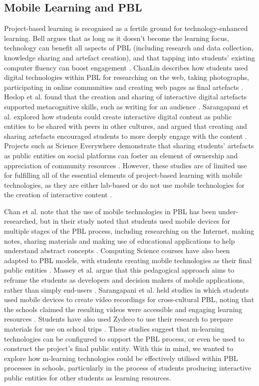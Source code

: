 \subsection{Mobile Learning and PBL}
Project-based learning is recognised as a fertile ground for technology-enhanced learning. Bell argues that as long as it doesn't become the learning focus, technology can benefit all aspects of PBL (including research and data collection, knowledge sharing and artefact creation), and that tapping into students' existing computer fluency can boost engagement \citep{Bell2010}. ChanLin describes how students used digital technologies within PBL for researching on the web, taking photographs, participating in online communities and creating web pages as final artefacts \citep{ChanLin2008}. Heslop et al. found that the creation and sharing of interactive digital artefacts supported metacognitive skills, such as writing for an audience \citep{Heslop2017}. Sarangapani et al. explored how students could create interactive digital content as public entities to be shared with peers in other cultures, and argued that creating and sharing artefacts encouraged students to more deeply engage with the content \citep{Sarangapani2018}. Projects such as Science Everywhere demonstrate that sharing students' artefacts as public entities on social platforms can foster an element of ownership and appreciation of community resources \citep{ahn2018}. However, these studies are of limited use for fulfilling all of the essential elements of project-based learning with mobile technologies, as they are either lab-based \citep{Heslop2017} or do not use mobile technologies for the creation of interactive content \citep{Sarangapani2018, ChanLin2008}.

Chan et al. note that the use of mobile technologies in PBL has been under-researched, but in their study noted that students used mobile devices for multiple stages of the PBL process, including researching on the Internet, making notes, sharing materials and making use of educational applications to help understand abstract concepts \citep{Chan2015}. Computing Science courses have also been adapted to PBL models, with students creating mobile technologies as their final public entities \citep{Massey2006, Rahman2018}. Massey et al. argue that this pedagogical approach aims to reframe the students as developers and decision makers of mobile applications, rather than simply end-users \citep{Massey2006}. Sarangapani et al. held studies in which students used mobile devices to create video recordings for cross-cultural PBL, noting that the schools claimed the resulting videos were accessible and engaging learning resources \citep{Sarangapani2016}. Students have also used Zydeco to use their research to prepare materials for use on school trips \citep{kuhn2011}. These studies suggest that m-learning technologies can be configured to support the PBL process, or even be used to construct the project's final public entity. With this in mind, we wanted to explore how m-learning technologies could be effectively utilised within PBL processes in schools, particularly in the process of students producing interactive public entities for other students as learning resources.

